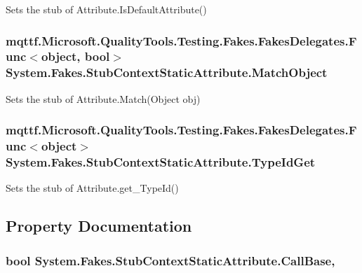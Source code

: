 Sets the stub of Attribute.\-Is\-Default\-Attribute()

\hypertarget{class_system_1_1_fakes_1_1_stub_context_static_attribute_aac8dd7b5439512382697b7f86e36ca1c}{
\subsubsection[{Match\-Object}]{\setlength{\rightskip}{0pt plus 5cm}mqttf.\-Microsoft.\-Quality\-Tools.\-Testing.\-Fakes.\-Fakes\-Delegates.\-Func$<$object, bool$>$ System.\-Fakes.\-Stub\-Context\-Static\-Attribute.\-Match\-Object}}\label{class_system_1_1_fakes_1_1_stub_context_static_attribute_aac8dd7b5439512382697b7f86e36ca1c}


Sets the stub of Attribute.\-Match(\-Object obj)

\hypertarget{class_system_1_1_fakes_1_1_stub_context_static_attribute_aeaf11da9a16249d30c1d4fb7363acde0}{
\subsubsection[{Type\-Id\-Get}]{\setlength{\rightskip}{0pt plus 5cm}mqttf.\-Microsoft.\-Quality\-Tools.\-Testing.\-Fakes.\-Fakes\-Delegates.\-Func$<$object$>$ System.\-Fakes.\-Stub\-Context\-Static\-Attribute.\-Type\-Id\-Get}}\label{class_system_1_1_fakes_1_1_stub_context_static_attribute_aeaf11da9a16249d30c1d4fb7363acde0}


Sets the stub of Attribute.\-get\-\_\-\-Type\-Id()



\subsection{Property Documentation}
\hypertarget{class_system_1_1_fakes_1_1_stub_context_static_attribute_ae3ecc751ba6e956af977026fc088a7d0}{
\subsubsection[{Call\-Base}]{\setlength{\rightskip}{0pt plus 5cm}bool System.\-Fakes.\-Stub\-Context\-Static\-Attribute.\-Call\-Base\hspace{0.3cm}{\ttfamily [get]}, {\ttfamily [set]}}}\label{class_system_1_1_fakes_1_1_stub_context_static_attribute_ae3ecc751ba6e956af977026fc088a7d0}


